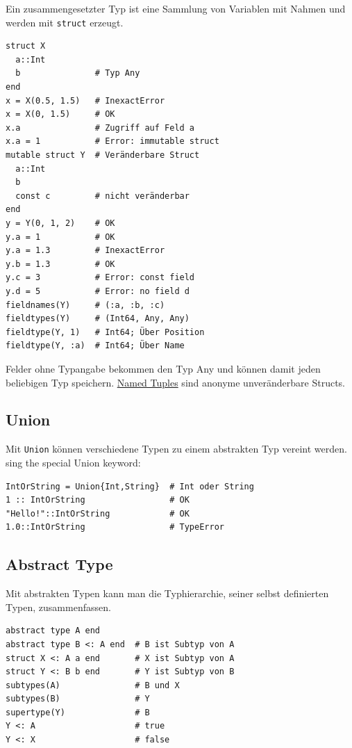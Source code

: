 \documentclass[10pt,twocolumn]{scrartcl}
\begin{document}
Ein zusammengesetzter Typ ist eine Sammlung von Variablen mit Nahmen und werden
mit \lstinline|struct| erzeugt.

\begin{lstlisting}
struct X
  a::Int
  b               # Typ Any
end
x = X(0.5, 1.5)   # InexactError
x = X(0, 1.5)     # OK
x.a               # Zugriff auf Feld a
x.a = 1           # Error: immutable struct
mutable struct Y  # Veränderbare Struct
  a::Int
  b
  const c         # nicht veränderbar
end
y = Y(0, 1, 2)    # OK
y.a = 1           # OK
y.a = 1.3         # InexactError
y.b = 1.3         # OK
y.c = 3           # Error: const field
y.d = 5           # Error: no field d
fieldnames(Y)     # (:a, :b, :c)
fieldtypes(Y)     # (Int64, Any, Any)
fieldtype(Y, 1)   # Int64; Über Position
fieldtype(Y, :a)  # Int64; Über Name
\end{lstlisting}

Felder ohne Typangabe bekommen den Typ Any und können damit jeden beliebigen Typ
speichern. \hyperref[ssec:tuple]{Named Tuples} sind anonyme unveränderbare
Structs.

\subsection{Union}
\label{ssec:union}

Mit \lstinline|Union| können verschiedene Typen zu einem abstrakten Typ vereint
werden.
sing the special Union keyword:

\begin{lstlisting}
IntOrString = Union{Int,String}  # Int oder String
1 :: IntOrString                 # OK
"Hello!"::IntOrString            # OK
1.0::IntOrString                 # TypeError
\end{lstlisting}

\subsection{Abstract Type}
\label{ssec:AbstractType}

Mit abstrakten Typen kann man die Typhierarchie, seiner selbst definierten Typen, zusammenfassen.

\begin{lstlisting}
abstract type A end
abstract type B <: A end  # B ist Subtyp von A
struct X <: A a end       # X ist Subtyp von A
struct Y <: B b end       # Y ist Subtyp von B
subtypes(A)               # B und X
subtypes(B)               # Y
supertype(Y)              # B
Y <: A                    # true
Y <: X                    # false
\end{lstlisting}
\end{document}
